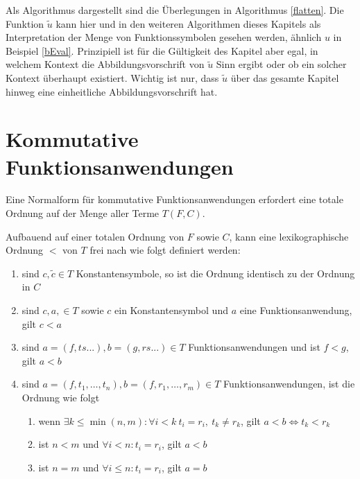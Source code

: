 Als Algorithmus dargestellt sind die Überlegungen in Algorithmus \ref{flatten}.
Die Funktion $\tilde u$ kann hier und in den weiteren Algorithmen dieses Kapitels als \grqq{} Interpretation der Menge von Funktionssymbolen gesehen werden, ähnlich $u$ in Beispiel \ref{bEval}. Prinzipiell ist für die Gültigkeit des Kapitel aber egal, in welchem Kontext die Abbildungsvorschrift von $\tilde u$ Sinn ergibt oder ob ein solcher Kontext überhaupt existiert. Wichtig ist nur, dass $\tilde u$ über das gesamte Kapitel hinweg eine einheitliche Abbildungsvorschrift hat.

\begin{algorithm}
\DontPrintSemicolon
\caption{$\Const{flatten} \colon T \rightarrow T$}\label{flatten}

\end{algorithm}

\section{Kommutative Funktionsanwendungen} \label{subsecNormalSortieren}
Eine Normalform für kommutative Funktionsanwendungen erfordert eine totale Ordnung auf der Menge aller Terme $T(F, C)$. 

\begin{definition} \label{defOrdnungKleiner}
Aufbauend auf einer totalen Ordnung von $F$ sowie $C$, kann eine lexikographische Ordnung $<$ von $T$ frei nach \cite{LexikografischeOrdnung} wie folgt definiert werden: 
\begin{enumerate}
	\item{sind $c, \tilde{c} \in T$ Konstantensymbole, so ist die Ordnung identisch zu der Ordnung in $C$}
	\item{sind $c, a, \in T$ sowie $c$ ein Konstantensymbol und $a$ eine Funktionsanwendung, gilt $c < a$ }
	\item{sind $a = (f, ts...), b = (g, rs...) \in T$ Funktionsanwendungen und ist $f < g$, gilt $a < b$}
	\item{sind $a = (f, t_1, \dots, t_n), b = (f, r_1, \dots, r_m) \in T$ Funktionsanwendungen, ist die Ordnung wie folgt}
	\begin{enumerate}
		\item{wenn $\exists k \leq \min{(n, m)} \colon \forall i < k ~ t_i = r_i ,~ t_k \neq r_k $, gilt ${a < b \iff t_k < r_k}$}
		\item{ist $n < m$ und $\forall i < n\colon t_i = r_i$, gilt $a < b$}
		\item{ist $n = m$ und $\forall i \leq n\colon t_i = r_i$, gilt $a = b$}
	\end{enumerate}
\end{enumerate}

\end{definition}


